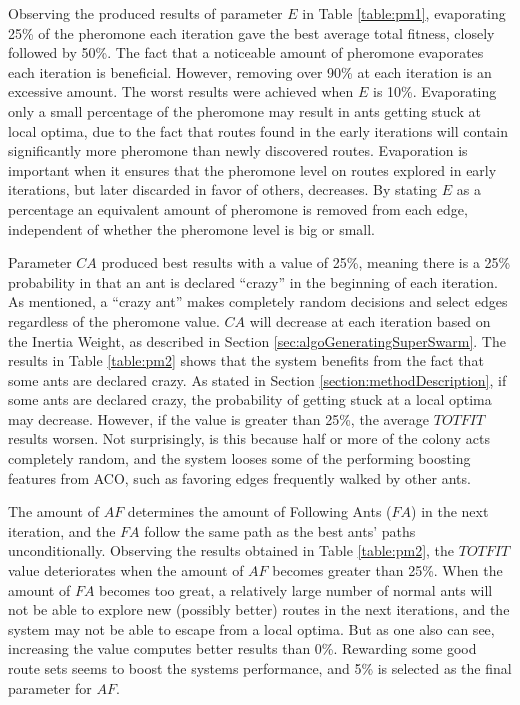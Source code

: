 
Observing the produced results of parameter $E$ in Table \vref{table:pm1}, evaporating 25\% of the pheromone each iteration gave the best average total fitness, closely followed by 50\%. The fact that a noticeable amount of pheromone evaporates each iteration is beneficial. However, removing over 90\% at each iteration is an excessive amount. The worst results were achieved when $E$ is 10\%. Evaporating only a small percentage of the pheromone may result in ants getting stuck at local optima, due to the fact that routes found in the early iterations will contain significantly more pheromone than newly discovered routes. Evaporation is important when it ensures that the pheromone level on routes explored in early iterations, but later discarded in favor of others, decreases. By stating $E$ as a percentage an equivalent amount of pheromone is removed from each edge, independent of whether the pheromone level is big or small. 
\newline

Parameter $CA$ produced best results with a value of 25\%, meaning there is a 25\% probability in that an ant is declared ``crazy'' in the beginning of each iteration. As mentioned, a ``crazy ant'' makes completely random decisions and select edges regardless of the pheromone value. $CA$ will decrease at each iteration based on the Inertia Weight, as described in Section \vref{sec:algoGeneratingSuperSwarm}. The results in Table \vref{table:pm2} shows that the system benefits from the fact that some ants are declared crazy. As stated in Section \vref{section:methodDescription}, if some ants are declared crazy, the probability of getting stuck at a local optima may decrease. However, if the value is greater than 25\%, the average $TOTFIT$ results worsen. Not surprisingly, is this because half or more of the colony acts completely random, and the system looses some of the performing boosting features from ACO, such as favoring edges frequently walked by other ants. 
\newline

The amount of $AF$ determines the amount of Following Ants ($FA$) in the next iteration, and the $FA$ follow the same path as the best ants' paths unconditionally. Observing the results obtained in Table \vref{table:pm2}, the $TOTFIT$ value deteriorates when the amount of $AF$ becomes greater than 25\%. When the amount of $FA$ becomes too great, a relatively large number of normal ants will not be able to explore new (possibly better) routes in the next iterations, and the system may not be able to escape from a local optima. But as one also can see, increasing the value computes better results than 0\%. Rewarding some good route sets seems to boost the systems performance, and 5\% is selected as the final parameter for $AF$. 

